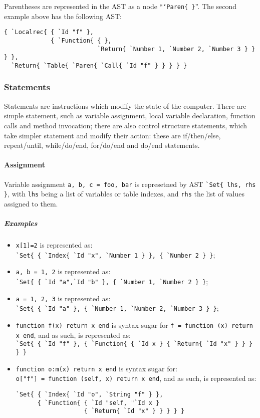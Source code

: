 Parentheses are represented in the AST as a node ``{\tt`Paren\{
  \}}''. The second example above has the following AST:

\begin{verbatim}
{ `Localrec{ { `Id "f" },  
             { `Function{ { },
                          `Return{ `Number 1, `Number 2, `Number 3 } } } },
  `Return{ `Table{ `Paren{ `Call{ `Id "f" } } } } }
\end{verbatim}

\subsubsection{Statements}

Statements are instructions which modify the state of the
computer. There are simple statement, such as variable assignment,
local variable declaration, function calls and method invocation;
there are also control structure statements, which take simpler
statement and modify their action: these are if/then/else,
repeat/until, while/do/end, for/do/end and do/end statements.

\paragraph{Assignment}
Variable assignment \verb+a, b, c = foo, bar+ is represetned by AST
\verb+`Set{ lhs, rhs }+, with {\tt lhs} being a list of variables or
table indexes, and {\tt rhs} the list of values assigned to them.

\subparagraph{Examples}
\begin{itemize}

\item \verb+x[1]=2+ is represented as:\\
  \verb+`Set{ { `Index{ `Id "x", `Number 1 } }, { `Number 2 } }+;

\item \verb+a, b = 1, 2+ is represented as:\\
  \verb+`Set{ { `Id "a",`Id "b" }, { `Number 1, `Number 2 } }+;

\item \verb+a = 1, 2, 3+ is represented as:\\
  \verb+`Set{ { `Id "a" }, { `Number 1, `Number 2, `Number 3 } }+;

\item \verb+function f(x) return x end+ is syntax sugar for
  \verb+f = function (x) return x end+, and as such, is represented as:\\
  \verb+`Set{ { `Id "f" }, { `Function{ { `Id x } { `Return{ `Id "x" } } } } }+

\item \verb+function o:m(x) return x end+ is syntax sugar for:\\
  \verb+o["f"] = function (self, x) return x end+, and as such, is
  represented as:
\begin{verbatim}
`Set{ { `Index{ `Id "o", `String "f" } }, 
      { `Function{ { `Id "self, "`Id x } 
                   { `Return{ `Id "x" } } } } }
\end{verbatim}

\end{itemize}

